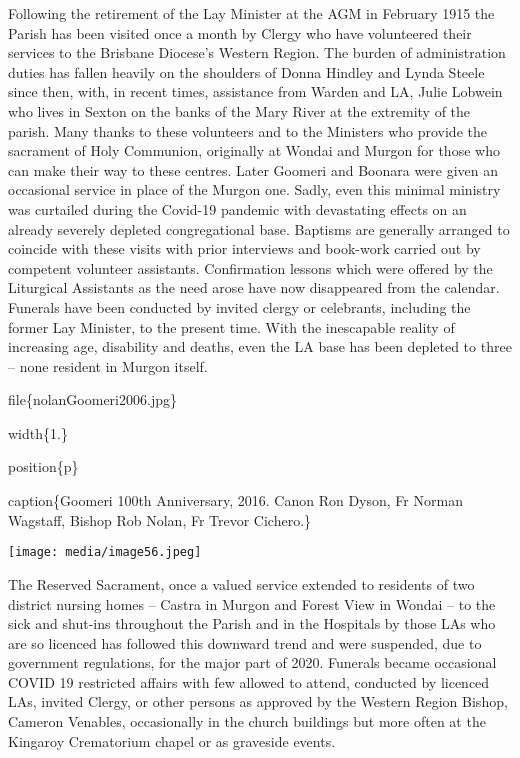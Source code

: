 Following the retirement of the Lay Minister at the AGM in February 1915 the Parish has been visited once a month by Clergy who have volunteered their services to the Brisbane Diocese's Western Region. The burden of administration duties has fallen heavily on the shoulders of Donna Hindley and Lynda Steele since then, with, in recent times, assistance from Warden and LA, Julie Lobwein who lives in Sexton on the banks of the Mary River at the extremity of the parish. Many thanks to these volunteers and to the Ministers who provide the sacrament of Holy Communion, originally at Wondai and Murgon for those who can make their way to these centres. Later Goomeri and Boonara were given an occasional service in place of the Murgon one. Sadly, even this minimal ministry was curtailed during the Covid-19 pandemic with devastating effects on an already severely depleted congregational base. Baptisms are generally arranged to coincide with these visits with prior interviews and book-work carried out by competent volunteer assistants. Confirmation lessons which were offered by the Liturgical Assistants as the need arose have now disappeared from the calendar. Funerals have been conducted by invited clergy or celebrants, including the former Lay Minister, to the present time. With the inescapable reality of increasing age, disability and deaths, even the LA base has been depleted to three -- none resident in Murgon itself.

file\{nolanGoomeri2006.jpg\}

width\{1.\}

position\{p\}

caption\{Goomeri 100th Anniversary, 2016. Canon Ron Dyson, Fr Norman Wagstaff, Bishop Rob Nolan, Fr Trevor Cichero.\}

\texttt{[image: media/image56.jpeg]}

The Reserved Sacrament, once a valued service extended to residents of two district nursing homes -- Castra in Murgon and Forest View in Wondai -- to the sick and shut-ins throughout the Parish and in the Hospitals by those LAs who are so licenced has followed this downward trend and were suspended, due to government regulations, for the major part of 2020. Funerals became occasional COVID 19 restricted affairs with few allowed to attend, conducted by licenced LAs, invited Clergy, or other persons as approved by the Western Region Bishop, Cameron Venables, occasionally in the church buildings but more often at the Kingaroy Crematorium chapel or as graveside events.

